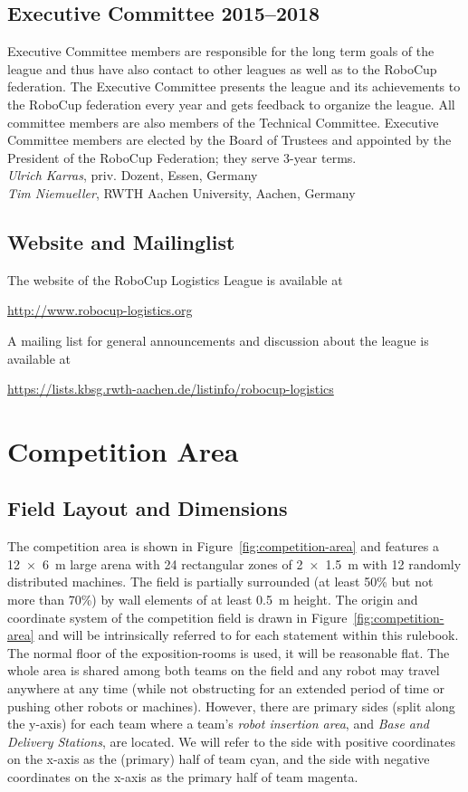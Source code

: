 \documentclass[12pt,twoside]{article}
\newcommand{\reffig}[1]{Figure~\ref{#1}}
\begin{document}
\subsection{Executive Committee 2015--2018}
\label{sec:oc}
Executive Committee members are responsible for the long term goals of
the league and thus have also contact to other leagues as well as to
the RoboCup federation. The Executive Committee presents the league
and its achievements to the RoboCup federation every year and gets
feedback to organize the league. All committee members are also
members of the Technical Committee. Executive Committee members are
elected by the Board of Trustees and appointed by the President of the
RoboCup Federation; they serve 3-year terms.\\[.5em]
\emph{Ulrich Karras}, priv. Dozent, Essen, Germany\\
\emph{Tim Niemueller}, RWTH Aachen University, Aachen, Germany

\subsection{Website and Mailinglist}
\label{sec:website-ml}
The website of the RoboCup Logistics League is available at\\
\centerline{\url{http://www.robocup-logistics.org}}

\smallskip
\noindent
A mailing list for general announcements and discussion about the
league is available at\\
\centerline{\url{https://lists.kbsg.rwth-aachen.de/listinfo/robocup-logistics}}


\section{Competition Area} \label{sec:area}
\subsection{Field Layout and Dimensions}
\label{sec:competition-area}
The competition area is shown in \reffig{fig:competition-area} and
features a \SI{12 x 6}{\metre} large arena with 24 rectangular zones
of \SI{2 x 1.5}{\metre} with 12 randomly distributed machines. The
field is partially surrounded (at least 50\% but not more than 70\%)
by wall elements of at least \SI{0.5}{\metre} height.  The origin and
coordinate system of the competition field is drawn in
\reffig{fig:competition-area} and will be intrinsically referred to
for each statement within this rulebook. The normal floor of the
exposition-rooms is used, it will be reasonable flat. The whole area
is shared among both teams on the field and any robot may travel
anywhere at any time (while not obstructing for an extended period of
time or pushing other robots or machines). However, there are primary
sides (split along the y-axis) for each team where a team's
\textit{robot insertion area}, and \textit{Base and Delivery
  Stations}, are located. We will refer to the side with positive
coordinates on the x-axis as the (primary) half of team cyan, and the
side with negative coordinates on the x-axis as the primary half of
team magenta.
\end{document}
